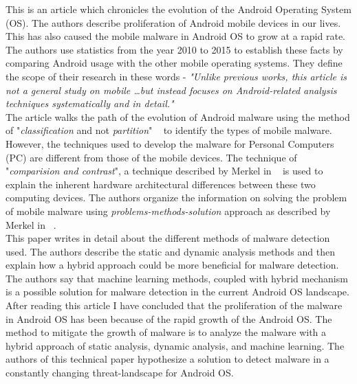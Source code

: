 \documentclass[letterpaper,10pt]{texMemo}
\begin{document}
This is an article which chronicles the evolution of the Android Operating System (OS). The authors describe proliferation of Android mobile devices in our lives. This has also caused the mobile malware in Android OS to grow at a rapid rate. The authors use statistics from the year 2010 to 2015 to establish these facts by comparing Android usage with the other mobile operating systems. They define the scope of their research in these words - \textit {"Unlike previous works, this article is not a general study on mobile \ldots but instead focuses on Android-related analysis techniques systematically and in detail."} ~\cite{Tam:2017:EAM:3022634.3017427} \\
The article walks the path of the evolution of Android malware using the method of "\textit{classification} and not \textit{partition}" ~\cite{markel_selber_2018_org_info} to identify the types of mobile malware. However, the techniques used to develop the malware for Personal Computers (PC) are different from those of the mobile devices. The technique of "\textit{comparision and contrast}", a technique described by Merkel in ~\cite{markel_selber_2018_org_info} is used to explain the inherent hardware architectural differences between these two computing devices. The authors organize the information on solving the problem of mobile malware using \textit{problems-methods-solution} approach as described by Merkel in ~\cite{markel_selber_2018_org_info}. \\
This paper writes in detail about the different methods of malware detection used. The authors describe the static and dynamic analysis methods and then explain how a hybrid approach could be more beneficial for malware detection. The authors say that machine learning methods, coupled with hybrid mechanism is a possible solution for malware detection in the current Android OS landscape. \\
After reading this article I have concluded that the proliferation of the malware in Android OS has been because of the rapid growth of the Android OS. The method to mitigate the growth of malware is to analyze the malware with a hybrid approach of static analysis, dynamic analysis, and machine learning. The authors of this technical paper hypothesize a solution to detect malware in a constantly changing threat-landscape for Android OS.
\end{document}
